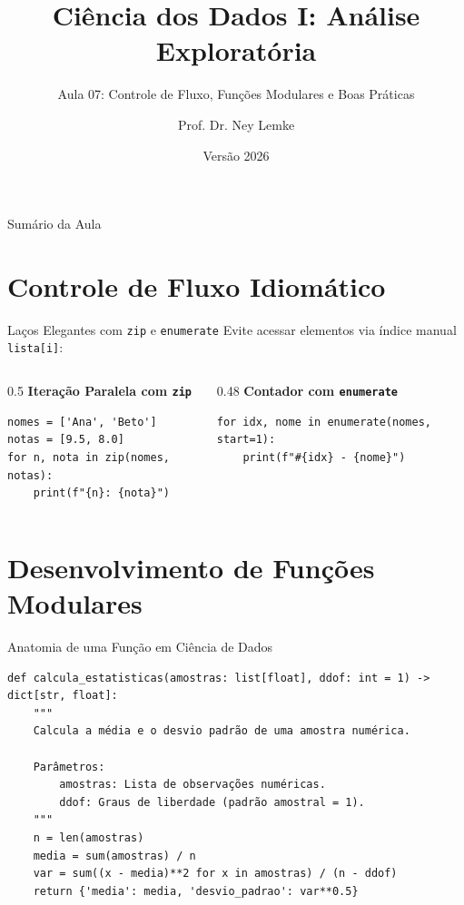 \documentclass[aspectratio=169, 10pt]{beamer}
\title[Aula 07 - Funções e Controle]{Ciência dos Dados I: Análise Exploratória}
\subtitle{Aula 07: Controle de Fluxo, Funções Modulares e Boas Práticas}
\author{Prof. Dr. Ney Lemke}
\institute{UNESP -- Instituto de Biociências de Botucatu}
\date{Versão 2026}
\begin{document}
\frame{\titlepage}

\begin{frame}{Sumário da Aula}
  \tableofcontents
\end{frame}

\section{Controle de Fluxo Idiomático}

\begin{frame}[fragile]{Laços Elegantes com \texttt{zip} e \texttt{enumerate}}
  Evite acessar elementos via índice manual \texttt{lista[i]}:
  \begin{columns}
    \begin{column}{0.5\textwidth}
      \textbf{Iteração Paralela com \texttt{zip}}
      \begin{lstlisting}
nomes = ['Ana', 'Beto']
notas = [9.5, 8.0]
for n, nota in zip(nomes, notas):
    print(f"{n}: {nota}")
      \end{lstlisting}
    \end{column}
    \begin{column}{0.48\textwidth}
      \textbf{Contador com \texttt{enumerate}}
      \begin{lstlisting}
for idx, nome in enumerate(nomes, start=1):
    print(f"#{idx} - {nome}")
      \end{lstlisting}
    \end{column}
  \end{columns}
\end{frame}

\section{Desenvolvimento de Funções Modulares}

\begin{frame}[fragile]{Anatomia de uma Função em Ciência de Dados}
  \begin{lstlisting}
def calcula_estatisticas(amostras: list[float], ddof: int = 1) -> dict[str, float]:
    """
    Calcula a média e o desvio padrão de uma amostra numérica.
    
    Parâmetros:
        amostras: Lista de observações numéricas.
        ddof: Graus de liberdade (padrão amostral = 1).
    """
    n = len(amostras)
    media = sum(amostras) / n
    var = sum((x - media)**2 for x in amostras) / (n - ddof)
    return {'media': media, 'desvio_padrao': var**0.5}
  \end{lstlisting}
\end{frame}
\end{document}
